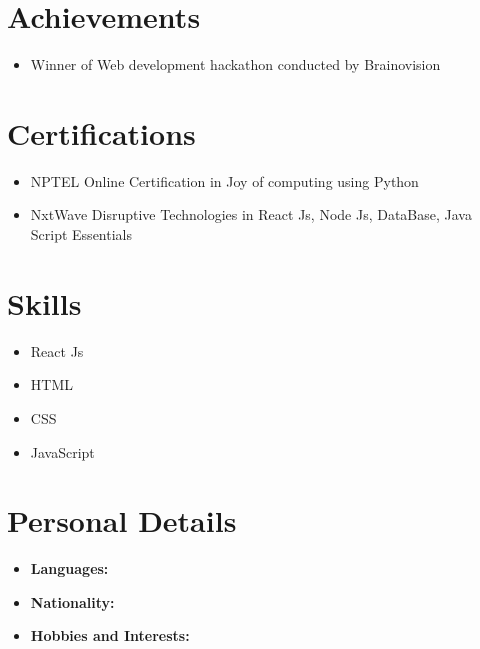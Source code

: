 \documentclass[a4paper,10pt]{article}
\begin{document}
\section*{Achievements}
\begin{itemize}
    \begin{itemize}
\item Winner of Web development hackathon conducted by Brainovision
\end{itemize}
\end{itemize}

\section*{Certifications}
\begin{itemize}
    \begin{itemize}
\item NPTEL Online Certification in Joy of computing using Python
\item NxtWave Disruptive Technologies in React Js, Node Js, DataBase, Java Script Essentials
\end{itemize}
\end{itemize}

\section*{Skills}
\begin{itemize}
    \begin{itemize}
\item React Js
\item HTML
\item CSS
\item JavaScript
\end{itemize}
\end{itemize}

\section*{Personal Details}
\begin{itemize}
    \item \textbf{Languages:} 
    \item \textbf{Nationality:} 
    \item \textbf{Hobbies and Interests:} 
\end{itemize}
\end{document}
